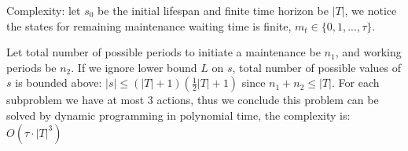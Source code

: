 \documentclass[../main]{subfiles}
\begin{document}
Complexity: let \(s_0\) be the initial lifespan and finite time horizon
be \(|T|\), we notice the states for remaining maintenance waiting time
is finite, \(m_t \in \{0, 1, ..., \tau\}\).

Let total number of possible periods to initiate a maintenance be
\(n_1\), and working periods be \(n_2\). If we ignore lower bound \(L\)
on \(s\), total number of possible values of \(s\) is bounded above:
\(|s| \le (|T| + 1)(\frac{1}{2}|T| + 1)\)
since \(n_1 + n_2 \le |T|\). For each subproblem we have at most 3
actions, thus we conclude this problem can be solved by dynamic
programming in polynomial time, the complexity is:
\(O\left(\tau\cdot|T|^3 \right)\)










\end{document}

